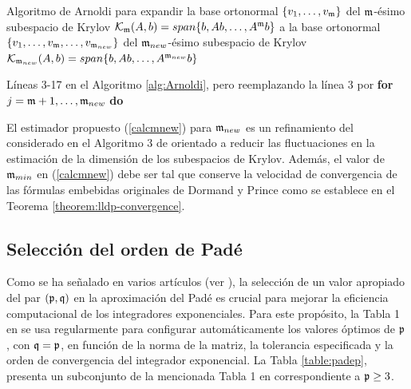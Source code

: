 \begin{algorithm}[!htb]
	\caption{Algoritmo de Arnoldi para expandir la base ortonormal $\{v_1,\ldots,v_{\mathfrak{m}} \}$ del $\mathfrak{m}$-ésimo subespacio de Krylov $\mathcal{K}_{\mathfrak{m}}(A,b)=span\{b,Ab,\ldots,A^{\mathfrak{m}}b\}$ a la base ortonormal $\{v_1,\ldots,v_{\mathfrak{m}},\ldots,v_{\mathfrak{m}_{new}} \}$ del $\mathfrak{m}_{new}$-ésimo subespacio de Krylov ${\mathcal{K}_{\mathfrak{m}_{new}}(A,b)=span\{b,Ab,\ldots,A^{\mathfrak{m}_{new}}b\}}$}
    \label{alg:Arnoldiexpand}
	Líneas 3-17 en el Algoritmo \ref{alg:Arnoldi}, pero reemplazando la línea 3 por \textbf{for} $j=\mathfrak{m}+1,\ldots,\mathfrak{m}_{new}$ \textbf{do}
\end{algorithm}
El estimador propuesto (\ref{calcmnew}) para $\mathfrak{m}_{new}$ es un refinamiento del considerado en el Algoritmo 3 de \cite{niesen2012algorithm} orientado a reducir las fluctuaciones en la estimación de la dimensión de los subespacios de Krylov. Además, el valor de $\mathfrak{m}_{min}$ en (\ref{calcmnew}) debe ser tal que conserve la velocidad de convergencia de las fórmulas embebidas originales de Dormand y Prince como se establece en el Teorema \ref{theorem:lldp-convergence}.

\subsection{Selección del orden de Padé}\label{sec:pade-order}
Como se ha señalado en varios artículos (ver \cite{jimenez2009rate,jimenez2012convergence, Jimenez14AMC, jimenez2015convergence}), la selección de un valor apropiado del par $(\mathfrak{p},\mathfrak{q})$ en la aproximación del Padé es crucial para mejorar la eficiencia computacional de los integradores exponenciales. Para este propósito, la Tabla 1 en \cite{moler2003nineteen} se usa regularmente para configurar automáticamente los valores óptimos de $\mathfrak{p}$, con $\mathfrak{q}=\mathfrak{p}$, en función de la norma de la matriz, la tolerancia especificada y la orden de convergencia del integrador exponencial. La Tabla \ref{table:padep}, presenta un subconjunto de la mencionada Tabla 1 en \cite{moler2003nineteen} correspondiente a $\mathfrak{p} \ge 3$.


